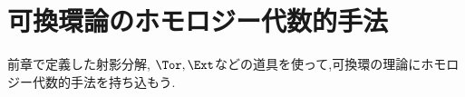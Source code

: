 \part[Homological method to ring theory]{可換環論のホモロジー代数的手法}
前章で定義した射影分解, $\Tor,\Ext$などの道具を使って,可換環の理論にホモロジー代数的手法を持ち込もう.

